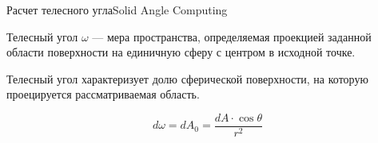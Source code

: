 \documentclass{beamer}
\begin{document}
	\begin{frame}{Расчет телесного угла}{Solid Angle Computing}
		
		Телесный угол $\omega$ --- мера пространства, определяемая проекцией заданной области поверхности на единичную сферу с центром в исходной точке.

		Телесный угол характеризует долю сферической поверхности, на которую проецируется рассматриваемая область.

		\[
			d \omega = d A_0 = \frac{d A \cdot \cos \theta}{ r^2}
		\]

	\end{frame}
\end{document}
